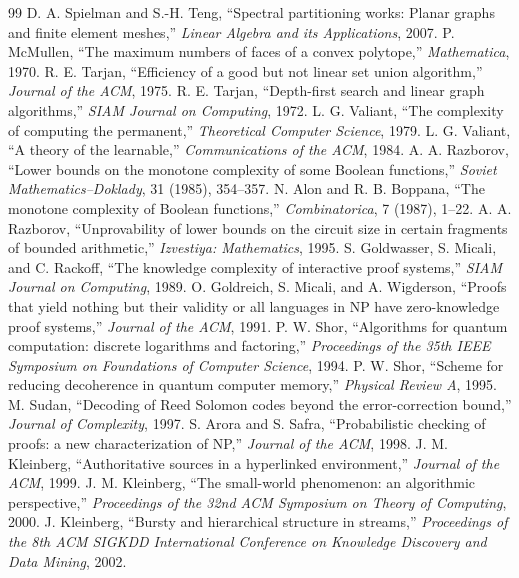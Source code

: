 \documentclass[11pt,oneside]{book}
\begin{document}
\begin{thebibliography}{99}
 D. A. Spielman and S.-H. Teng, ``Spectral partitioning works: Planar graphs and finite element meshes,'' \emph{Linear Algebra and its Applications}, 2007.
 P. McMullen, ``The maximum numbers of faces of a convex polytope,'' \emph{Mathematica}, 1970.
 R. E. Tarjan, ``Efficiency of a good but not linear set union algorithm,'' \emph{Journal of the ACM}, 1975.
 R. E. Tarjan, ``Depth-first search and linear graph algorithms,'' \emph{SIAM Journal on Computing}, 1972.
 L. G. Valiant, ``The complexity of computing the permanent,'' \emph{Theoretical Computer Science}, 1979.
 L. G. Valiant, ``A theory of the learnable,'' \emph{Communications of the ACM}, 1984.
 A. A. Razborov, ``Lower bounds on the monotone complexity of some Boolean functions,'' \emph{Soviet Mathematics--Doklady}, 31 (1985), 354--357.
 N. Alon and R. B. Boppana, ``The monotone complexity of Boolean functions,'' \emph{Combinatorica}, 7 (1987), 1--22.
 A. A. Razborov, ``Unprovability of lower bounds on the circuit size in certain fragments of bounded arithmetic,'' \emph{Izvestiya: Mathematics}, 1995.
 S. Goldwasser, S. Micali, and C. Rackoff, ``The knowledge complexity of interactive proof systems,'' \emph{SIAM Journal on Computing}, 1989.
 O. Goldreich, S. Micali, and A. Wigderson, ``Proofs that yield nothing but their validity or all languages in NP have zero-knowledge proof systems,'' \emph{Journal of the ACM}, 1991.
 P. W. Shor, ``Algorithms for quantum computation: discrete logarithms and factoring,'' \emph{Proceedings of the 35th IEEE Symposium on Foundations of Computer Science}, 1994.
 P. W. Shor, ``Scheme for reducing decoherence in quantum computer memory,'' \emph{Physical Review A}, 1995.
 M. Sudan, ``Decoding of Reed Solomon codes beyond the error-correction bound,'' \emph{Journal of Complexity}, 1997.
 S. Arora and S. Safra, ``Probabilistic checking of proofs: a new characterization of NP,'' \emph{Journal of the ACM}, 1998.
 J. M. Kleinberg, ``Authoritative sources in a hyperlinked environment,'' \emph{Journal of the ACM}, 1999.
 J. M. Kleinberg, ``The small-world phenomenon: an algorithmic perspective,'' \emph{Proceedings of the 32nd ACM Symposium on Theory of Computing}, 2000.
 J. Kleinberg, ``Bursty and hierarchical structure in streams,'' \emph{Proceedings of the 8th ACM SIGKDD International Conference on Knowledge Discovery and Data Mining}, 2002.

\end{thebibliography}
\end{document}
